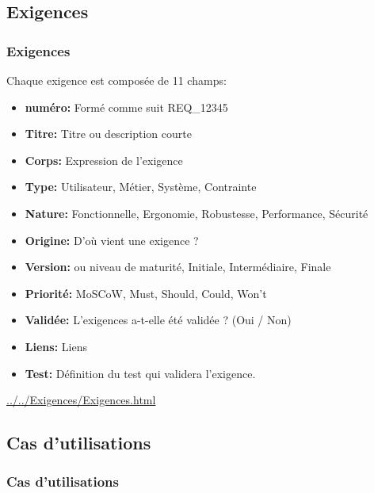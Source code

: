 \documentclass{beamer}
\begin{document}
\subsection{Exigences}
\begin{frame}
 \frametitle{Exigences}
Chaque exigence est composée de 11 champs:
\begin{itemize}
\item \textbf{numéro:} Formé comme suit REQ\_12345
\item \textbf{Titre:} Titre ou description courte
\item \textbf{Corps:} Expression de l'exigence
\item \textbf{Type:} Utilisateur, Métier, Système, Contrainte
\item \textbf{Nature:} Fonctionnelle, Ergonomie, Robustesse, Performance, Sécurité
\item \textbf{Origine:} D'où vient une exigence ?
\item \textbf{Version:} ou niveau de maturité, Initiale, Intermédiaire, Finale
\item \textbf{Priorité:} MoSCoW, Must, Should, Could, Won't
\item \textbf{Validée:} L'exigences a-t-elle été validée ? (Oui / Non)
\item \textbf{Liens:} Liens
\item \textbf{Test:} Définition du test qui validera l'exigence.
\end{itemize}

\url{../../Exigences/Exigences.html}
\end{frame}

\subsection{Cas d'utilisations}
\begin{frame}
 \frametitle{Cas d'utilisations}

\end{frame}
\end{document}
